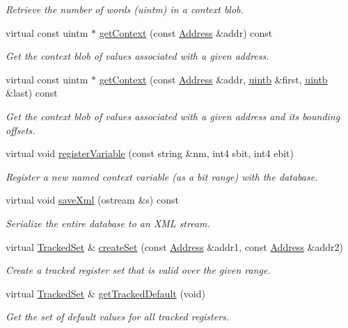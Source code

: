 \begin{DoxyCompactItemize}
\begin{DoxyCompactList}\small\item\em Retrieve the number of words (uintm) in a context {\itshape blob}. \end{DoxyCompactList}\item 
virtual const uintm $\ast$ \mbox{\hyperlink{class_context_ghidra_a222fa5ff7a23b1b5242a6be7da1b438f}{get\+Context}} (const \mbox{\hyperlink{class_address}{Address}} \&addr) const
\begin{DoxyCompactList}\small\item\em Get the context blob of values associated with a given address. \end{DoxyCompactList}\item 
virtual const uintm $\ast$ \mbox{\hyperlink{class_context_ghidra_a9ea9dfd15af6e45cc089cafeef2e90d7}{get\+Context}} (const \mbox{\hyperlink{class_address}{Address}} \&addr, \mbox{\hyperlink{types_8h_a2db313c5d32a12b01d26ac9b3bca178f}{uintb}} \&first, \mbox{\hyperlink{types_8h_a2db313c5d32a12b01d26ac9b3bca178f}{uintb}} \&last) const
\begin{DoxyCompactList}\small\item\em Get the context blob of values associated with a given address and its bounding offsets. \end{DoxyCompactList}\item 
virtual void \mbox{\hyperlink{class_context_ghidra_ab71324da92653ec926463cf81b741432}{register\+Variable}} (const string \&nm, int4 sbit, int4 ebit)
\begin{DoxyCompactList}\small\item\em Register a new named context variable (as a bit range) with the database. \end{DoxyCompactList}\item 
virtual void \mbox{\hyperlink{class_context_ghidra_a8d1d4fb7225ec04dec7b5e3c950e79bb}{save\+Xml}} (ostream \&s) const
\begin{DoxyCompactList}\small\item\em Serialize the entire database to an X\+ML stream. \end{DoxyCompactList}\item 
virtual \mbox{\hyperlink{globalcontext_8hh_a7559d2c55c5d12fbbaf0418733b62438}{Tracked\+Set}} \& \mbox{\hyperlink{class_context_ghidra_ab7f9df57870baceb7776fd8dcdbd5287}{create\+Set}} (const \mbox{\hyperlink{class_address}{Address}} \&addr1, const \mbox{\hyperlink{class_address}{Address}} \&addr2)
\begin{DoxyCompactList}\small\item\em Create a tracked register set that is valid over the given range. \end{DoxyCompactList}\item 
virtual \mbox{\hyperlink{globalcontext_8hh_a7559d2c55c5d12fbbaf0418733b62438}{Tracked\+Set}} \& \mbox{\hyperlink{class_context_ghidra_a7eca09e7b7d72d65669b91e79e16971b}{get\+Tracked\+Default}} (void)
\begin{DoxyCompactList}\small\item\em Get the set of default values for all tracked registers. \end{DoxyCompactList}\end{DoxyCompactItemize}

